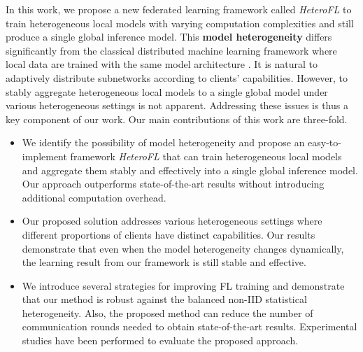 \documentclass{article} %
\begin{document}
In this work, we propose a new federated learning framework called \textit{HeteroFL} to train heterogeneous local models with varying computation complexities and still produce a single global inference model. This \textbf{model heterogeneity} differs significantly from the classical distributed machine learning framework where local data are trained with the same model architecture \citep{li2020federated, ben2019demystifying}. It is natural to adaptively distribute subnetworks according to clients' capabilities. However, to stably aggregate heterogeneous local models to a single global model under various heterogeneous settings is not apparent. Addressing these issues is thus a key component of our work. 
Our main contributions of this work are three-fold.
\begin{itemize}
\item 
We identify the possibility of model heterogeneity and propose an easy-to-implement framework \textit{HeteroFL} that can train heterogeneous local models and aggregate them stably and effectively into a single global inference model. Our approach outperforms state-of-the-art results without introducing additional computation overhead.

\item 
Our proposed solution addresses various heterogeneous settings where different proportions of clients have distinct capabilities. Our results demonstrate that even when the model heterogeneity changes dynamically, the learning result from our framework is still stable and effective.

\item We introduce several strategies for improving FL training and demonstrate that our method is robust against the balanced non-IID statistical heterogeneity. Also, the proposed method can reduce the number of communication rounds needed to obtain state-of-the-art results. Experimental studies have been performed to evaluate the proposed approach. 

\end{itemize}
\end{document}
